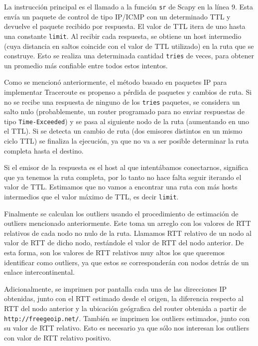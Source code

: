 La instrucción principal es el llamado a la función \texttt{sr} de Scapy en la línea 9. Esta envía un paquete de control de tipo IP/ICMP con un determinado TTL y devuelve el paquete recibido por respuesta. El valor de TTL itera de uno hasta una constante \texttt{limit}. Al recibir cada respuesta, se obtiene un host intermedio (cuya distancia en saltos coincide con el valor de TTL utilizado) en la ruta que se construye. Esto se realiza una determinada cantidad \texttt{tries} de veces, para obtener un promedio más confiable entre todos estos intentos.

Como se mencionó anteriormente, el método basado en paquetes IP para implementar Traceroute es propenso a pérdida de paquetes y cambios de ruta. Si no se recibe una respuesta de ninguno de los \texttt{tries} paquetes,
se considera un salto nulo (probablemente, un router programado para no enviar respuestas de tipo \texttt{Time-Exceeded}) y se pasa al siguiente nodo de la ruta (aumentando en uno el TTL). Si se detecta un cambio de ruta (dos emisores distintos en un mismo ciclo TTL) se finaliza la ejecución, ya que no va a ser posible determinar la ruta completa hasta el destino.

Si el emisor de la respuesta es el host al que intentábamos conectarnos, significa que ya tenemos la ruta completa, por lo tanto no hace falta seguir iterando el valor de TTL. Estimamos que no vamos a encontrar una ruta con más hosts intermedios que el valor máximo de TTL, es decir \texttt{limit}.

Finalmente se calculan los outliers usando el procedimiento de estimación de outliers mencionado anteriormente. Este toma un arreglo con los valores de RTT relativos de cada nodo no nulo de la ruta. Llamamos RTT relativo de un nodo al valor de RTT de dicho nodo, restándole el valor de RTT del nodo anterior. De esta forma, son los valores de RTT relativos muy altos los que queremos identificar como outliers, ya que estos se corresponderán con nodos detrás de un enlace intercontinental.

Adicionalmente, se imprimen por pantalla cada una de las direcciones IP obtenidas, junto con el RTT estimado desde el origen, la diferencia respecto al RTT del nodo anterior y la ubicación geógrafica del router obtenida a partir de \texttt{http://freegeoip.net/}. También se imprimen los outliers estimados, junto con su valor de RTT relativo. Esto es necesario ya que sólo nos interesan los outliers con valor de RTT relativo positivo.
